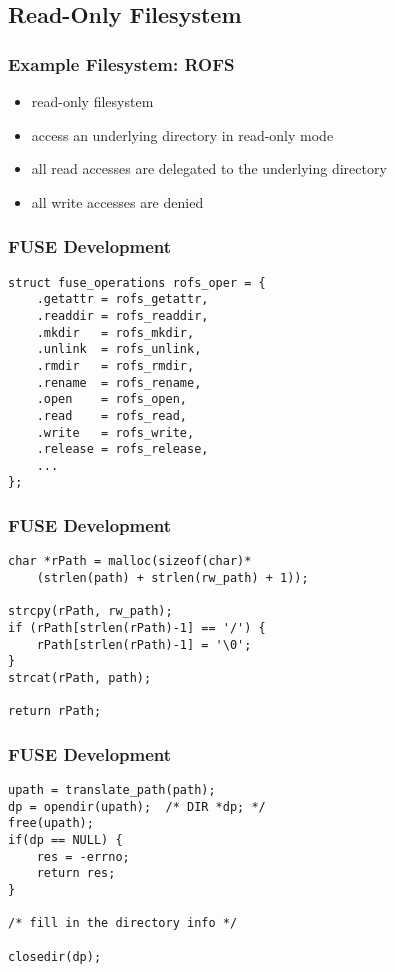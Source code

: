 \documentclass[dvipsnames]{beamer}
\begin{document}
\subsection{Read-Only Filesystem}

\begin{frame}
  \frametitle{Example Filesystem: ROFS}

  \begin{itemize}
    \item read-only filesystem
    \item access an underlying directory in read-only mode
    \item all read accesses are delegated to the underlying directory
    \item all write accesses are denied
  \end{itemize}
\end{frame}

\begin{frame}[fragile]
  \frametitle{FUSE Development}

  \begin{example}
    \begin{lstlisting}
struct fuse_operations rofs_oper = {
    .getattr = rofs_getattr,
    .readdir = rofs_readdir,
    .mkdir   = rofs_mkdir,
    .unlink  = rofs_unlink,
    .rmdir   = rofs_rmdir,
    .rename  = rofs_rename,
    .open    = rofs_open,
    .read    = rofs_read,
    .write   = rofs_write,
    .release = rofs_release,
    ...
};
    \end{lstlisting}
  \end{example}
\end{frame}

\begin{frame}[fragile]
  \frametitle{FUSE Development}

  \begin{example}
    \begin{lstlisting}
char *rPath = malloc(sizeof(char)*
    (strlen(path) + strlen(rw_path) + 1));

strcpy(rPath, rw_path);
if (rPath[strlen(rPath)-1] == '/') {
    rPath[strlen(rPath)-1] = '\0';
}
strcat(rPath, path);

return rPath;
    \end{lstlisting}
  \end{example}
\end{frame}

\begin{frame}[fragile]
  \frametitle{FUSE Development}

  \begin{example}
    \begin{lstlisting}
upath = translate_path(path);
dp = opendir(upath);  /* DIR *dp; */
free(upath);
if(dp == NULL) {
    res = -errno;
    return res;
}

/* fill in the directory info */

closedir(dp);
    \end{lstlisting}
  \end{example}
\end{frame}
\end{document}

